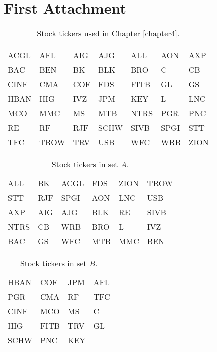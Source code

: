 \documentclass[12pt,a4paper]{report}
\let\openright=\clearpage
\begin{document}
\section{First Attachment}
\begin{center}
\begin{table}[H]
\centering
\begin{tabular}{lllllll}
\toprule
        &     &      &      &      &      \\
 ACGL &   AFL &  AIG &   AJG &   ALL &   AON &   AXP \\
  BAC &   BEN &   BK &   BLK &   BRO &     C &    CB \\
 CINF &   CMA &  COF &   FDS &  FITB &    GL &    GS \\
 HBAN &   HIG &  IVZ &   JPM &   KEY &     L &   LNC \\
   MCO &   MMC &   MS &   MTB &  NTRS &   PGR &   PNC \\
   RE &    RF &  RJF &  SCHW &  SIVB &  SPGI &   STT \\
   TFC &  TROW &  TRV &   USB &   WFC &   WRB &  ZION \\
   \bottomrule
\end{tabular}
\caption{Stock tickers used in Chapter \ref{chapter4}.}
\label{table:stock_tickers_used}
\end{table}

\begin{table}[H]
\centering
\begin{tabular}{llllll}
\toprule
ALL &   BK &  ACGL &  FDS &  ZION &  TROW \\
 STT &  RJF &  SPGI &  AON &   LNC &   USB \\
 AXP &  AIG &   AJG &  BLK &    RE &  SIVB \\
 NTRS &   CB &   WRB &  BRO &     L &   IVZ \\
  BAC &   GS &   WFC &  MTB &   MMC &   BEN \\
  \bottomrule
\end{tabular}
\caption{Stock tickers in set $A$.}
\label{table:stock_tickers_in_set_A}
\end{table}


\begin{table}[H]
\centering
\begin{tabular}{llll}
\toprule
 HBAN &   COF &  JPM &  AFL \\
 PGR &   CMA &   RF &  TFC \\
 CINF &   MCO &   MS &    C \\
  HIG &  FITB &  TRV &   GL \\
 SCHW &   PNC &  KEY &     \\
 \bottomrule
\end{tabular}
\caption{Stock tickers in set $B$.}
\label{table:stock_tickers_in_set_B}
\end{table}



\end{center}




\openright
\end{document}
